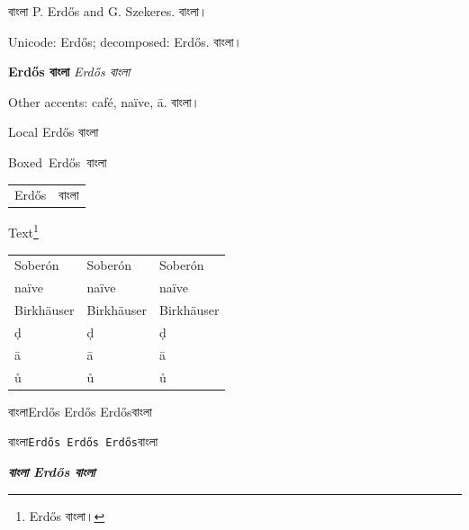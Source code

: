 বাংলা P. Erd{\H{o}}s and G. Szekeres. বাংলা।\par
Unicode: Erdős; decomposed: Erdős. বাংলা।\par
\textbf{Erd{\H{o}}s বাংলা} \textit{Erd{\H{o}}s বাংলা}\par
Other accents: caf\'{e}, na\"{i}ve, \={a}. বাংলা।\par
{\accenttestfont Local Erd{\H{o}}s বাংলা}\par
\mbox{Boxed Erd{\H{o}}s বাংলা}\par
\begin{tabular}{ll}
  Erd{\H{o}}s & বাংলা\\
\end{tabular}
Text\footnote{Erd{\H{o}}s বাংলা।}

\par
\begin{tabular}{lll}
  Soberón & Soberón & Sober\'{o}n\\
  naïve & naïve & na\"{i}ve\\
  Birkhäuser & Birkhäuser & Birkh\"{a}user\\
  ḍ & ḍ & \d{d}\\
  ā & ā & \={a}\\
  ů & ů & \r{u}
\end{tabular}
\par
বাংলা\textsf{Erdős Erdős Erd{\H{o}}s}বাংলা\par
বাংলা\texttt{Erdős Erdős Erd{\H{o}}s}বাংলা\par
\textbf{\textit{বাংলা Erd{\H{o}}s বাংলা}}\par
